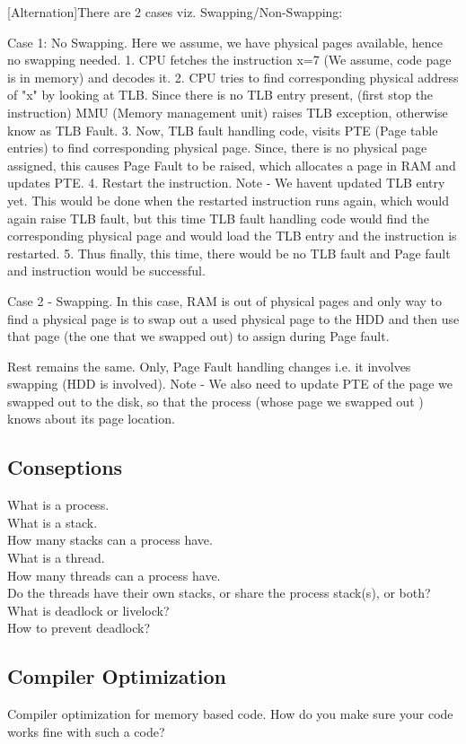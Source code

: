 [Alternation]There are 2 cases viz. Swapping/Non-Swapping: 

Case 1: No Swapping. 
Here we assume, we have physical pages available, hence no swapping needed. 
1. CPU fetches the instruction x=7 (We assume, code page is in memory) and decodes it. 
2. CPU tries to find corresponding physical address of "x" by looking at TLB. Since there is no TLB entry present, (first stop the instruction) MMU (Memory management unit) raises 
TLB exception, otherwise know as TLB Fault. 
3. Now, TLB fault handling code, visits PTE (Page table entries) to find corresponding physical page. Since, there is no physical page assigned, this causes Page Fault to be 
raised, which allocates a page in RAM and updates PTE. 
4. Restart the instruction. 
Note - We havent updated TLB entry yet. This would be done when the restarted instruction runs again, which would again raise TLB fault, but this time TLB fault handling code 
would find the corresponding physical page and would load the TLB entry and the instruction is restarted. 
5. Thus finally, this time, there would be no TLB fault and Page fault and instruction would be successful.

Case 2 - Swapping. 
In this case, RAM is out of physical pages and only way to find a physical page is to swap out a used physical page to the HDD and then use that page (the one that we swapped out) 
to assign during Page fault. 

Rest remains the same. Only, Page Fault handling changes i.e. it involves swapping (HDD is involved). Note - We also need to update PTE of the page we swapped out to the disk, so 
that the process (whose page we swapped out ) knows about its page location.

\subsection{Conseptions}
What is a process. \\
What is a stack. \\
How many stacks can a process have. \\
What is a thread. \\
How many threads can a process have. \\
Do the threads have their own stacks, or share the process stack(s), or both?\\
What is deadlock or livelock?\\
How to prevent deadlock?

\subsection{Compiler Optimization}
Compiler optimization for memory based code. How do you make sure your code works fine with such a code?

